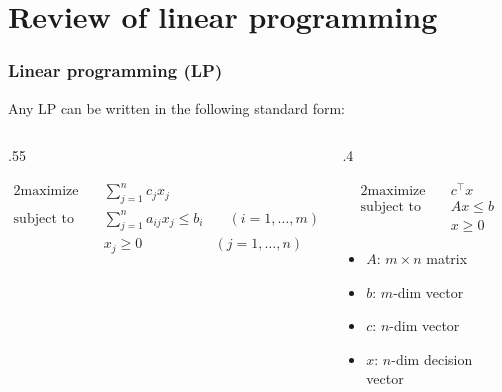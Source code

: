\documentclass[14pt,aspectratio=169,xcolor=dvipsnames,table,onlytextwidth]{beamer}
\begin{document}
\section{Review of linear programming}
\begin{frame}
    \frametitle{Linear programming (LP)}

    Any LP can be written in the following standard form:
    \begin{columns}[T]
    \begin{column}{.55\textwidth}
    \begin{block}{}
        \small
        \setlength{\abovedisplayskip}{0pt}
        \begin{alignat*}{2}
            \text{maximize} & \quad  \sum_{j = 1}^n c_j x_j & \\
            \text{subject to} & \quad \sum_{j = 1}^n a_{ij} x_j \leq b_i & \quad (i = 1, \dots, m) \\
            & \quad x_j \geq 0 \quad & (j = 1, \dots, n)
        \end{alignat*}
    \end{block}
    \end{column}
    \begin{column}{.4\textwidth}
        \pause
    \begin{block}{}
        \setlength{\abovedisplayskip}{0pt}
        \begin{alignat*}{2}
            \text{maximize} & \quad  c^\top x \\
            \text{subject to} & \quad A x \leq b  \\
            & \quad x \geq 0 
        \end{alignat*}
    \end{block}
        \footnotesize
        \begin{itemize}
            \item $A$: $m \times n$ matrix
            \item $b$: $m$-dim vector
            \item $c$: $n$-dim vector
            \item $x$: $n$-dim decision vector
        \end{itemize}
    \end{column}
    \end{columns}
\end{frame}
\end{document}
